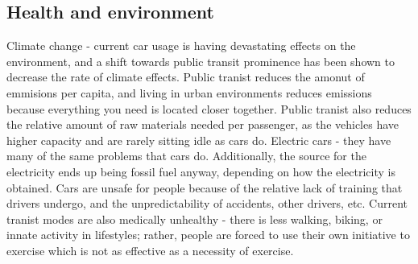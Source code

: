 \documentclass{article}
\begin{document}
    \subsection{Health and environment}
    \begin{outline}
        \1 Climate change - current car usage is having devastating effects on the environment, and a shift towards public transit prominence has been shown to decrease the rate of climate effects. Public tranist reduces the amonut of emmisions per capita, and living in urban environments reduces emissions because everything you need is located closer together. 
        \1 Public tranist also reduces the relative amount of raw materials needed per passenger, as the vehicles have higher capacity and are rarely sitting idle as cars do. 
        \1 Electric cars - they have many of the same problems that cars do. Additionally, the source for the electricity ends up being fossil fuel anyway, depending on how the electricity is obtained. 
        \1 Cars are unsafe for people because of the relative lack of training that drivers undergo, and the unpredictability of accidents, other drivers, etc. 
        \1 Current tranist modes are also medically unhealthy - there is less walking, biking, or innate activity in lifestyles; rather, people are forced to use their own initiative to exercise which is not as effective as a necessity of exercise. 
        
    \end{outline}
\end{document}

